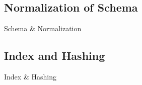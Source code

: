 \subsection{Normalization of Schema}
\label{sect:sub-title}
Schema \& Normalization

\subsection{Index and Hashing}
\label{sect:sub-title}
Index \& Hashing